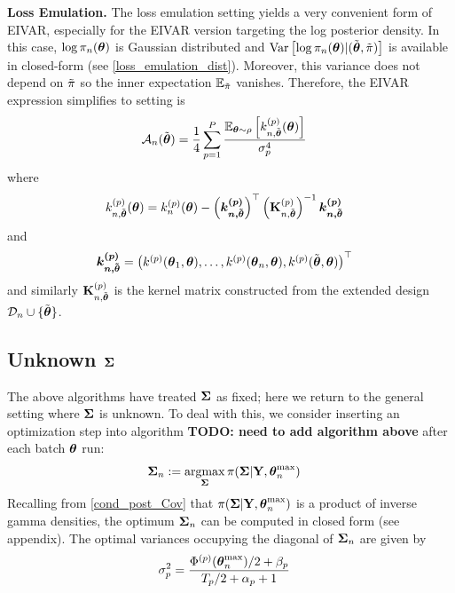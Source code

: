 \documentclass[12pt]{article}
\begin{document}
\bigskip
\noindent
\textbf{Loss Emulation.} The loss emulation setting yields a very convenient form of EIVAR, especially for the EIVAR version targeting the log posterior density. In this case,
$\log \pi_{n}(\boldsymbol{\theta})$ is Gaussian distributed and $\mathrm{Var}\left[\log \pi_{n}(\boldsymbol{\theta}) | (\tilde{\boldsymbol{\theta}}, \tilde{\pi}) \right]$ is 
available in closed-form (see \ref{loss_emulation_dist}). Moreover, this variance does not depend on $\tilde{\pi}$ so the inner expectation $\mathbb{E}_{\tilde{\pi}}$ vanishes. 
Therefore, the EIVAR expression simplifies to  
setting is 
\begin{align}
\mathcal{A}_{n}(\tilde{\boldsymbol{\theta}}) &= \frac{1}{4} \sum_{p = 1}^{P} \frac{\mathbb{E}_{\boldsymbol{\theta} \sim \rho}\left[k_{n, \tilde{\boldsymbol{\theta}}}^{(p)}(\boldsymbol{\theta})\right]}{\sigma_{p}^4} \label{EIVAR_llik_loss_emulation}
\end{align}
where 
\begin{align*}
k_{n, \tilde{\boldsymbol{\theta}}}^{(p)}(\boldsymbol{\theta}) &= k_{n}^{(p)}(\boldsymbol{\theta}) - \left(\boldsymbol{k^{(p)}_{n,\tilde{\boldsymbol{\theta}}}}\right)^\top \left(\mathbf{K}_{n, \tilde{\boldsymbol{\theta}}}^{(p)}\right)^{-1} \boldsymbol{k^{(p)}_{n, \tilde{\boldsymbol{\theta}}}}
\end{align*}
and 
\begin{align*}
\boldsymbol{k^{(p)}_{n, \tilde{\boldsymbol{\theta}}}} &= \begin{pmatrix} k^{(p)}(\boldsymbol{\theta}_1, \boldsymbol{\theta}), \dots, 
														       k^{(p)}(\boldsymbol{\theta}_{n}, \boldsymbol{\theta}), 
														       k^{(p)}(\tilde{\boldsymbol{\theta}}, \boldsymbol{\theta})  \end{pmatrix}^\top 
\end{align*}
and similarly $\mathbf{K}_{n, \tilde{\boldsymbol{\theta}}}^{(p)}$ is the kernel matrix constructed from the extended design $\mathcal{D}_{n} \cup \{\tilde{\boldsymbol{\theta}}\}$.

\subsection{Unknown $\boldsymbol{\Sigma}$}
The above algorithms have treated $\boldsymbol{\Sigma}$ as fixed; here we return to the general setting where $\boldsymbol{\Sigma}$ is unknown. To deal with this, we consider inserting an 
optimization step into algorithm \textbf{TODO: need to add algorithm above} after each batch $\boldsymbol{\theta}$ run:
\begin{align}
\boldsymbol{\Sigma}_{n} &:= \operatorname*{argmax}_{\boldsymbol{\Sigma}} \pi(\boldsymbol{\Sigma}|\mathbf{Y}, \boldsymbol{\theta}_{n}^{\text{max}}) \label{Cov_optimization}
\end{align}
Recalling from \ref{cond_post_Cov} that $\pi(\boldsymbol{\Sigma}|\mathbf{Y}, \boldsymbol{\theta}_{n}^{\text{max}})$ is a product of inverse gamma densities, the optimum $\boldsymbol{\Sigma}_{n}$ can 
be computed in closed form (see appendix). The optimal variances occupying the diagonal of $\boldsymbol{\Sigma}_{n}$ are given by 
\begin{align}
\sigma_{p}^2 &= \frac{\Phi^{(p)}(\boldsymbol{\theta}_{n}^{\text{max}})/2 + \beta_{p}}{T_{p}/2 + \alpha_{p} + 1}
\end{align}
\end{document}
